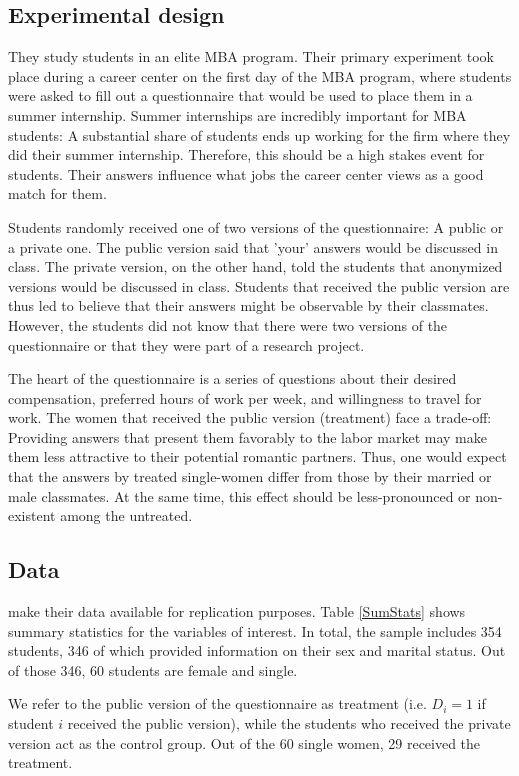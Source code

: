 \documentclass[aodsor,preprint]{imsart}
\numberwithin{equation}{section}
\theoremstyle{plain}
\begin{document}
\subsection{Experimental design}
They study students in an elite MBA program. Their primary experiment took place during a career center on the first day of the MBA program, where students were asked to fill out a questionnaire that would be used to place them in a summer internship. Summer internships are incredibly important for MBA students: A substantial share of students ends up working for the firm where they did their summer internship. Therefore, this should be a high stakes event for students. Their answers influence what jobs the career center views as a good match for them.

Students randomly received one of two versions of the questionnaire: A public or a private one. The public version said that 'your' answers would be discussed in class. The private version, on the other hand, told the students that anonymized versions would be discussed in class. Students that received the public version are thus led to believe that their answers might be observable by their classmates. However, the students did not know that there were two versions of the questionnaire or that they were part of a research project.

The heart of the questionnaire is a series of questions about their desired compensation, preferred hours of work per week, and willingness to travel for work. The women that received the public version (treatment) face a trade-off: Providing answers that present them favorably to the labor market may make them less attractive to their potential romantic partners. Thus, one would expect that the answers by treated single-women differ from those by their married or male classmates. At the same time, this effect should be less-pronounced or non-existent among the untreated.


\subsection{Data}

\cite{Bursztyn_2017} make their data available for replication purposes. Table \ref{SumStats} shows summary statistics for the variables of interest. In total, the sample includes 354 students, 346 of which provided information on their sex and marital status. Out of those 346, 60 students are female and single.

We refer to the public version of the questionnaire as treatment (i.e. $D_i = 1$ if student $i$ received the public version), while the students who received the private version act as the control group. Out of the 60 single women, 29 received the treatment.
\end{document}
